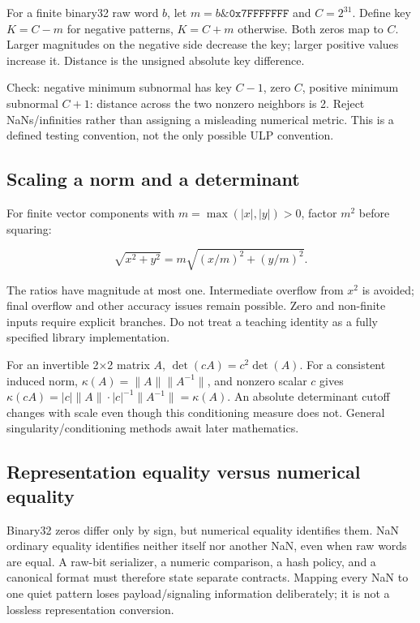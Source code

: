 For a finite binary32 raw word \(b\), let \(m=b\mathbin{\&}\texttt{0x7FFFFFFF}\) and \(C=2^{31}\). Define key \(K=C-m\) for negative patterns, \(K=C+m\) otherwise. Both zeros map to \(C\). Larger magnitudes on the negative side decrease the key; larger positive values increase it. Distance is the unsigned absolute key difference.

Check: negative minimum subnormal has key \(C-1\), zero \(C\), positive minimum subnormal \(C+1\): distance across the two nonzero neighbors is 2. Reject NaNs/infinities rather than assigning a misleading numerical metric. This is a defined testing convention, not the only possible ULP convention.

\subsection{Scaling a norm and a determinant}\label{01-foundations-i-ch011-scaling-a-norm-and-a-determinant}

\hypertarget{01-foundations-i-ch011-scaling-a-norm-and-a-determinant}{}

For finite vector components with \(m=\max(|x|,|y|)>0\), factor \(m^2\) before squaring:

\[
\sqrt{x^2+y^2}=m\sqrt{(x/m)^2+(y/m)^2}.
\]

The ratios have magnitude at most one. Intermediate overflow from \(x^2\) is avoided; final overflow and other accuracy issues remain possible. Zero and non-finite inputs require explicit branches. Do not treat a teaching identity as a fully specified library implementation.

For an invertible 2×2 matrix \(A\), \(\det(cA)=c^2\det(A)\). For a consistent induced norm, \(\kappa(A)=\|A\|\|A^{-1}\|\), and nonzero scalar \(c\) gives \(\kappa(cA)=|c|\|A\|\cdot|c|^{-1}\|A^{-1}\|=\kappa(A)\). An absolute determinant cutoff changes with scale even though this conditioning measure does not. General singularity/conditioning methods await later mathematics.

\subsection{Representation equality versus numerical equality}\label{01-foundations-i-ch011-representation-equality-versus-numerical-equality}

\hypertarget{01-foundations-i-ch011-representation-equality-versus-numerical-equality}{}

Binary32 zeros differ only by sign, but numerical equality identifies them. NaN ordinary equality identifies neither itself nor another NaN, even when raw words are equal. A raw-bit serializer, a numeric comparison, a hash policy, and a canonical format must therefore state separate contracts. Mapping every NaN to one quiet pattern loses payload/signaling information deliberately; it is not a lossless representation conversion.

